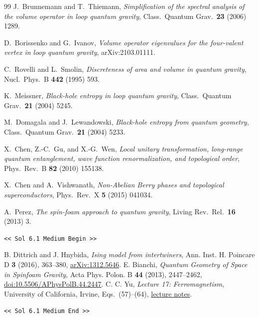 \documentclass[11pt,a4paper]{article}
\theoremstyle{definition}
\newcommand{\GPTBegin}{\par\noindent\textcolor{GPTMarker}{\texttt{\textless\textless{} Sol 6.1 Medium Begin \textgreater\textgreater}}\par}
\newcommand{\GPTEnd}{\par\noindent\textcolor{GPTMarker}{\texttt{\textless\textless{} Sol 6.1 Medium End \textgreater\textgreater}}\par}
\begin{document}
\begin{thebibliography}{99}
  J.\ Brunnemann and T.\ Thiemann,
  \emph{Simplification of the spectral analysis of the volume operator in loop quantum gravity},
  Class.\ Quantum Grav.\ \textbf{23} (2006) 1289.

  D.\ Borissenko and G.\ Ivanov,
  \emph{Volume operator eigenvalues for the four-valent vertex in loop quantum gravity},
  arXiv:2103.01111.

  C.\ Rovelli and L.\ Smolin,
  \emph{Discreteness of area and volume in quantum gravity},
  Nucl.\ Phys.\ B \textbf{442} (1995) 593.

  K.\ Meissner,
  \emph{Black-hole entropy in loop quantum gravity},
  Class.\ Quantum Grav.\ \textbf{21} (2004) 5245.

  M.\ Domagala and J.\ Lewandowski,
  \emph{Black-hole entropy from quantum geometry},
  Class.\ Quantum Grav.\ \textbf{21} (2004) 5233.

  X.\ Chen, Z.-C.\ Gu, and X.-G.\ Wen,
  \emph{Local unitary transformation, long-range quantum entanglement, wave function renormalization, and topological order},
  Phys.\ Rev.\ B \textbf{82} (2010) 155138.

  X.\ Chen and A.\ Vishwanath,
  \emph{Non-Abelian Berry phases and topological superconductors},
  Phys.\ Rev.\ X \textbf{5} (2015) 041034.

  A.\ Perez,
  \emph{The spin-foam approach to quantum gravity},
  Living Rev.\ Rel.\ \textbf{16} (2013) 3.

\GPTBegin{}
 B. Dittrich and J. Hnybida, \emph{Ising model from intertwiners},
 Ann. Inst. H. Poincare D \textbf{3} (2016), 363--380,
 \href{https://arxiv.org/abs/1312.5646}{arXiv:1312.5646}.
 E. Bianchi, \emph{Quantum Geometry of Space in Spinfoam Gravity},
 Acta Phys. Polon. B \textbf{44} (2013), 2447--2462,
 \href{https://doi.org/10.5506/APhysPolB.44.2447}{doi:10.5506/APhysPolB.44.2447}.
 C. C. Yu, \emph{Lecture 17: Ferromagnetism}, University of California, Irvine,
 Eqs.~(57)--(64),
 \href{https://webapps.ps.uci.edu/~cyu/p115A/LectureNotes/Lecture17/html_version/lecture17.html}{lecture notes}.
\GPTEnd{}

\end{thebibliography}
\end{document}
